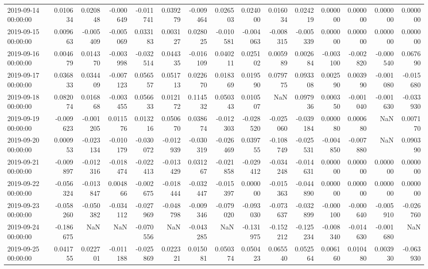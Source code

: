 \begin{tabular}{lrrrrrrrrrrrrrr}
2019-09-14 00:00:00 & 0.010634 & 0.020848 & -0.000649 & -0.011741 & 0.039279 & -0.009464 & 0.026503 & 0.024000 & 0.016034 & 0.024219 & 0.000000 & 0.000000 & 0.000000 & 0.000000 \\
2019-09-15 00:00:00 & 0.009663 & -0.005409 & -0.005069 & 0.033183 & 0.003127 & 0.028025 & -0.010581 & -0.004063 & -0.008315 & -0.005339 & 0.000000 & 0.000000 & 0.000000 & 0.000000 \\
2019-09-16 00:00:00 & 0.004679 & 0.014370 & -0.003998 & -0.032514 & 0.044335 & -0.016109 & 0.040211 & 0.025102 & 0.005989 & 0.002684 & -0.003100 & -0.002820 & -0.000540 & 0.067690 \\
2019-09-17 00:00:00 & 0.036833 & 0.034409 & -0.007123 & 0.056557 & 0.051713 & 0.022670 & 0.018369 & 0.019590 & 0.079775 & 0.093308 & 0.002590 & 0.003990 & -0.001080 & -0.015680 \\
2019-09-18 00:00:00 & 0.082074 & 0.016868 & -0.003455 & 0.056633 & 0.012172 & 0.114532 & 0.050343 & 0.010507 & NaN & 0.097936 & 0.000350 & -0.001040 & -0.001630 & -0.033930 \\
2019-09-19 00:00:00 & -0.009623 & -0.001205 & 0.011576 & 0.013216 & 0.050670 & 0.038674 & -0.012303 & -0.028520 & -0.025060 & -0.039184 & 0.000080 & 0.000680 & NaN & 0.007170 \\
2019-09-20 00:00:00 & 0.000953 & -0.023134 & -0.010179 & -0.030072 & -0.012939 & -0.030319 & -0.026469 & 0.039755 & -0.108749 & -0.025531 & -0.004850 & -0.007880 & NaN & 0.090390 \\
2019-09-21 00:00:00 & -0.009897 & -0.012316 & -0.018474 & -0.022413 & -0.013429 & 0.031267 & -0.021858 & -0.029412 & -0.034248 & -0.014631 & 0.000000 & 0.000000 & 0.000000 & 0.000000 \\
2019-09-22 00:00:00 & -0.056324 & -0.013847 & 0.004866 & -0.002675 & -0.018444 & -0.032447 & -0.015397 & 0.000000 & -0.015363 & -0.044890 & 0.000000 & 0.000000 & 0.000000 & 0.000000 \\
2019-09-23 00:00:00 & -0.058260 & -0.050382 & -0.034112 & -0.027969 & -0.048798 & -0.009346 & -0.079020 & -0.093030 & -0.073637 & -0.032899 & -0.000100 & -0.000640 & -0.005910 & -0.026760 \\
2019-09-24 00:00:00 & -0.186675 & NaN & NaN & -0.070556 & NaN & -0.043285 & NaN & -0.131975 & -0.152212 & -0.125234 & -0.008340 & -0.014630 & -0.001680 & NaN \\
2019-09-25 00:00:00 & 0.041755 & 0.022701 & -0.011188 & -0.025869 & 0.022321 & 0.015081 & 0.050374 & 0.050423 & 0.065540 & 0.052564 & 0.006160 & 0.010480 & 0.003930 & -0.063930 \\

\end{tabular}
